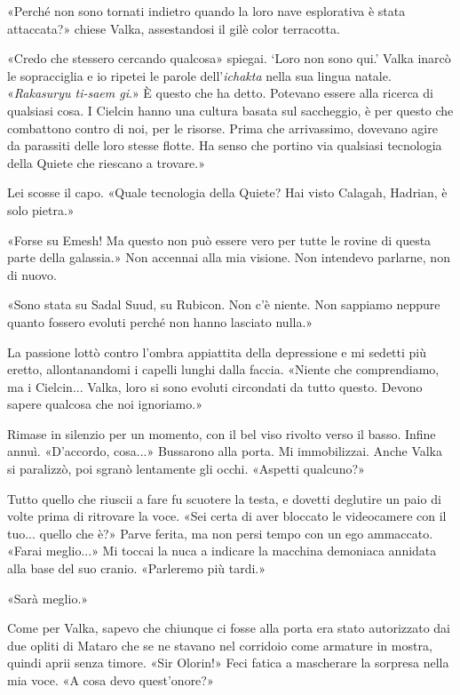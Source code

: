 «Perché non sono tornati indietro quando la loro nave esplorativa è
stata attaccata?» chiese Valka, assestandosi il gilè color terracotta.

«Credo che stessero cercando qualcosa» spiegai. `Loro non sono qui.'
Valka inarcò le sopracciglia e io ripetei le parole dell'\emph{ichakta}
nella sua lingua natale. «\emph{Rakasuryu ti-saem gi}.» È questo che ha
detto. Potevano essere alla ricerca di qualsiasi cosa. I Cielcin hanno
una cultura basata sul saccheggio, è per questo che combattono contro di
noi, per le risorse. Prima che arrivassimo, dovevano agire da parassiti
delle loro stesse flotte. Ha senso che portino via qualsiasi tecnologia
della Quiete che riescano a trovare.»

Lei scosse il capo. «Quale tecnologia della Quiete? Hai visto Calagah,
Hadrian, è solo pietra.»

«Forse su Emesh! Ma questo non può essere vero per tutte le rovine di
questa parte della galassia.» Non accennai alla mia visione. Non
intendevo parlarne, non di nuovo.

«Sono stata su Sadal Suud, su Rubicon. Non c'è niente. Non sappiamo
neppure quanto fossero evoluti perché non hanno lasciato nulla.»

La passione lottò contro l'ombra appiattita della depressione e mi
sedetti più eretto, allontanandomi i capelli lunghi dalla faccia.
«Niente che comprendiamo, ma i Cielcin... Valka, loro si sono evoluti
circondati da tutto questo. Devono sapere qualcosa che noi ignoriamo.»

Rimase in silenzio per un momento, con il bel viso rivolto verso il
basso. Infine annuì. «D'accordo, cosa...» Bussarono alla porta. Mi
immobilizzai. Anche Valka si paralizzò, poi sgranò lentamente gli occhi.
«Aspetti qualcuno?»

Tutto quello che riuscii a fare fu scuotere la testa, e dovetti
deglutire un paio di volte prima di ritrovare la voce. «Sei certa di
aver bloccato le videocamere con il tuo... quello che è?» Parve ferita,
ma non persi tempo con un ego ammaccato. «Farai meglio...» Mi toccai la
nuca a indicare la macchina demoniaca annidata alla base del suo cranio.
«Parleremo più tardi.»

«Sarà meglio.»

Come per Valka, sapevo che chiunque ci fosse alla porta era stato
autorizzato dai due opliti di Mataro che se ne stavano nel corridoio
come armature in mostra, quindi aprii senza timore. «Sir Olorin!» Feci
fatica a mascherare la sorpresa nella mia voce. «A cosa devo
quest'onore?»

